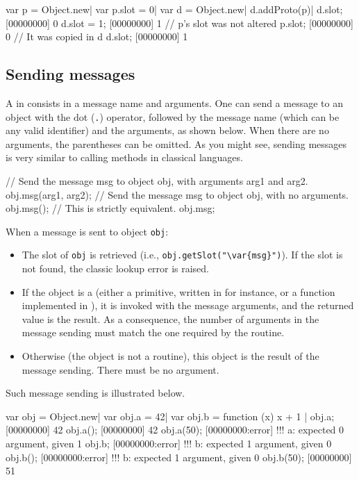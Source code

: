 \begin{urbiscript}[firstnumber=last]
var p = Object.new|
var p.slot = 0|
var d = Object.new|
d.addProto(p)|
d.slot;
[00000000] 0
d.slot = 1;
[00000000] 1
// p's slot was not altered
p.slot;
[00000000] 0
// It was copied in d
d.slot;
[00000000] 1
\end{urbiscript}

\subsection{Sending messages}

A  in \us consists in a message name and arguments. One can
send a message to an object with the dot (\lstinline|.|) operator,
followed by the message name (which can be any valid identifier) and
the arguments, as shown below. When there are no
arguments, the parentheses can be omitted. As you might see,
sending messages is very similar to calling methods in classical
languages.

\begin{urbiunchecked}
// Send the message msg to object obj, with arguments arg1 and arg2.
obj.msg(arg1, arg2);
// Send the message msg to object obj, with no arguments.
obj.msg();
// This is strictly equivalent.
obj.msg;
\end{urbiunchecked}

When a message  is sent to object \lstinline|obj|:

\begin{itemize}
\item The  slot of \lstinline|obj| is retrieved (i.e.,
  \lstinline|obj.getSlot("\var{msg}")|). If the slot is not found, the
  classic lookup error is raised.
\item If the object is a  (either a primitive, written in
  \Cxx for instance, or a function implemented in \us), it is invoked
  with the message arguments, and the returned value is the result. As
  a consequence, the number of arguments in the message sending must
  match the one required by the routine.
\item Otherwise (the object is not a routine), this object is the
  result of the message sending. There must be no argument.
\end{itemize}

Such message sending is illustrated below.

\begin{urbiscript}[firstnumber=last]
var obj = Object.new|
var obj.a = 42|
var obj.b = function (x) { x + 1 }|
obj.a;
[00000000] 42
obj.a();
[00000000] 42
obj.a(50);
[00000000:error] !!! a: expected 0 argument, given 1
obj.b;
[00000000:error] !!! b: expected 1 argument, given 0
obj.b();
[00000000:error] !!! b: expected 1 argument, given 0
obj.b(50);
[00000000] 51
\end{urbiscript}


